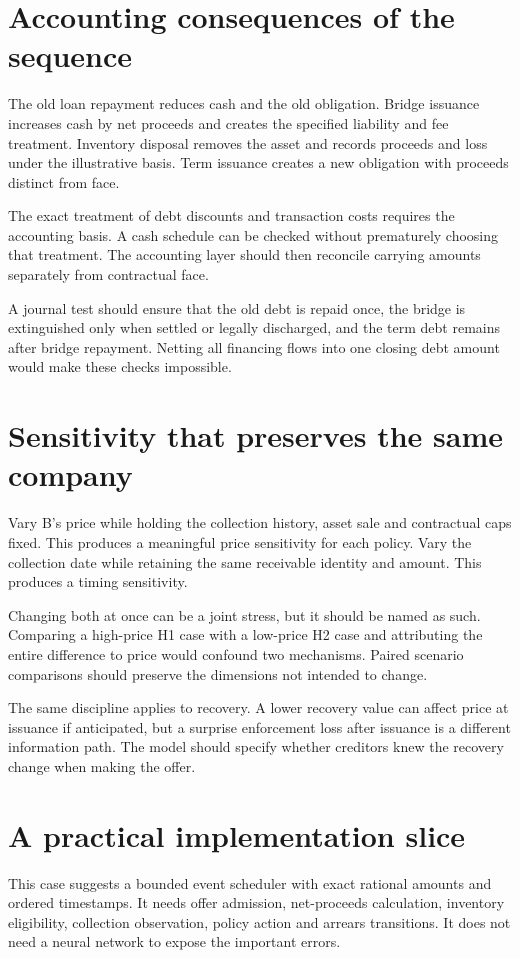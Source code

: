 \section{Accounting consequences of the sequence}
The old loan repayment reduces cash and the old obligation. Bridge issuance increases cash by net proceeds and creates the specified liability and fee treatment. Inventory disposal removes the asset and records proceeds and loss under the illustrative basis. Term issuance creates a new obligation with proceeds distinct from face.

The exact treatment of debt discounts and transaction costs requires the accounting basis. A cash schedule can be checked without prematurely choosing that treatment. The accounting layer should then reconcile carrying amounts separately from contractual face.

A journal test should ensure that the old debt is repaid once, the bridge is extinguished only when settled or legally discharged, and the term debt remains after bridge repayment. Netting all financing flows into one closing debt amount would make these checks impossible.

\section{Sensitivity that preserves the same company}
Vary B's price while holding the collection history, asset sale and contractual caps fixed. This produces a meaningful price sensitivity for each policy. Vary the collection date while retaining the same receivable identity and amount. This produces a timing sensitivity.

Changing both at once can be a joint stress, but it should be named as such. Comparing a high-price H1 case with a low-price H2 case and attributing the entire difference to price would confound two mechanisms. Paired scenario comparisons should preserve the dimensions not intended to change.

The same discipline applies to recovery. A lower recovery value can affect price at issuance if anticipated, but a surprise enforcement loss after issuance is a different information path. The model should specify whether creditors knew the recovery change when making the offer.

\section{A practical implementation slice}
This case suggests a bounded event scheduler with exact rational amounts and ordered timestamps. It needs offer admission, net-proceeds calculation, inventory eligibility, collection observation, policy action and arrears transitions. It does not need a neural network to expose the important errors.

